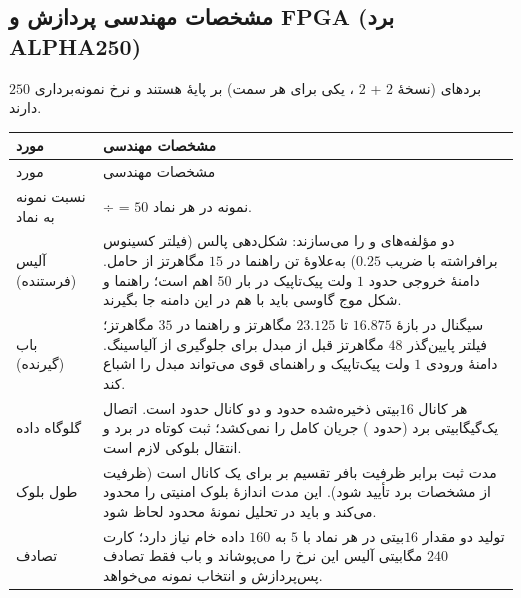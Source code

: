 \subsection{مشخصات مهندسی پردازش و FPGA (برد ALPHA250)}
بردهای  (نسخهٔ $2$  + $2$ ، یکی برای هر سمت) بر پایهٔ  هستند و نرخ نمونه‌برداری $250$  دارند\verify{}.
\begin{longtable}{R{3.6cm}R{11.2cm}}
\toprule {} مورد & مشخصات مهندسی \\ \midrule
\endfirsthead
\toprule {} مورد & مشخصات مهندسی \\ \midrule
\endhead
نسبت نمونه به نماد &  ÷  = $50$ نمونه در هر نماد. \\
آلیس (فرستنده) & دو  مؤلفه‌های  و  را می‌سازند: شکل‌دهی پالس (فیلتر کسینوس برافراشته با ضریب $0.25$) به‌علاوهٔ تن راهنما در $15$ مگاهرتز از حامل. دامنهٔ خروجی حدود $1$ ولت پیک‌تاپیک در بار $50$ اهم است؛ راهنما و شکل موج گاوسی باید با هم در این دامنه جا بگیرند. \\
باب (گیرنده) & سیگنال در بازهٔ $16.875$ تا $23.125$ مگاهرتز و راهنما در $35$ مگاهرتز؛ فیلتر پایین‌گذر $48$ مگاهرتز قبل از مبدل برای جلوگیری از آلیاسینگ. دامنهٔ ورودی $1$ ولت پیک‌تاپیک و راهنمای قوی می‌تواند مبدل را اشباع کند. \\
گلوگاه داده & هر کانال $16$بیتی ذخیره‌شده حدود  و دو کانال حدود  است. اتصال یک‌گیگابیتی برد (حدود ) جریان کامل را نمی‌کشد؛ ثبت کوتاه در  برد و انتقال بلوکی لازم است. \\
طول بلوک & مدت ثبت برابر ظرفیت بافر تقسیم بر  برای یک کانال است (ظرفیت  از مشخصات برد تأیید شود\verify{}). این مدت اندازهٔ بلوک امنیتی را محدود می‌کند و باید در تحلیل نمونهٔ محدود لحاظ شود. \\
تصادف & تولید دو مقدار $16$بیتی در هر نماد با $5$  به $160$  داده خام نیاز دارد؛ کارت  $240$ مگابیتی آلیس این نرخ را می‌پوشاند و باب فقط تصادف پس‌پردازش و انتخاب نمونه می‌خواهد. \\
\bottomrule\end{longtable}

